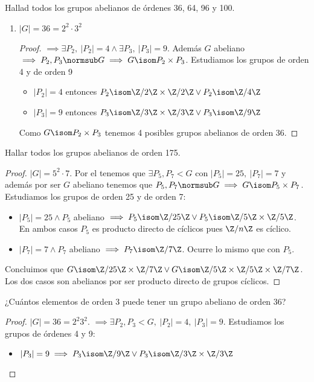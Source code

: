 \begin{ex}[H4.20] Hallad todos los grupos abelianos de órdenes 36, 64, 96 y 100.
	\begin{enumerate}
		\item $|G| = 36 = 2^2\cdot3^2$
		\begin{proof}
			 $\implies \exists P_2,\ |P_2| = 4 \land \exists P_3,\ |P_3| = 9$. Además $G$ abeliano $\implies P_2, P_3 \normsub G \implies G \isom P_2 \times P_3$. Estudiamos los grupos de orden 4 y de orden 9
			\begin{itemize}
				\item $|P_2| = 4$ entonces $P_2 \isom \Z/2\Z \times \Z/2\Z \lor P_2 \isom \Z/4\Z$
				\item $|P_3| = 9$ entonces $P_3 \isom \Z/3\Z \times \Z/3\Z \lor P_3 \isom \Z/9\Z$
			\end{itemize}
			Como $G \isom P_2 \times P_3$ tenemos 4 posibles grupos abelianos de orden 36.
		\end{proof}
	\end{enumerate}
\end{ex}

\begin{ex}[H4.22]
	Hallar todos los grupos abelianos de orden 175.
	
	\begin{proof}
		$|G| = 5^2\cdot 7$. Por el  tenemos que $\exists P_5, P_7 < G$ con $|P_5| = 25,\ |P_7| = 7$ y además por ser $G$ abeliano tenemos que $P_5, P_7 \normsub G \implies G \isom P_5 \times P_7$. Estudiamos los grupos de orden 25 y de orden 7:
		\begin{itemize}
			\item $|P_5| = 25 \land P_5$ abeliano $\implies P_5 \isom \Z/25\Z \lor P_5 \isom \Z/5\Z \times \Z/5\Z$. En ambos casos $P_5$ es producto directo de cíclicos pues $\Z/n\Z$ es cíclico.
			\item $|P_7| = 7 \land P_7$ abeliano $\implies P_7 \isom \Z/7\Z$. Ocurre lo mismo que con $P_5$.
		\end{itemize}
		Concluimos que $G \isom \Z/25\Z \times \Z/7\Z \lor G \isom \Z/5\Z \times \Z/5\Z \times \Z/7\Z$. Los dos casos son abelianos por ser producto directo de grupos cíclicos.
	\end{proof}
\end{ex}

\begin{ex}[H4.23]
	¿Cuántos elementos de orden 3 puede tener un grupo abeliano de orden 36?
	
	\begin{proof}
		$|G| = 36 = 2^2 3^2$.  $\implies \exists P_2, P_3 < G,\ |P_2| = 4,\ |P_3| = 9$. Estudiamos los grupos de órdenes 4 y 9:
		\begin{itemize}
			\item $|P_3| = 9 \implies P_3 \isom \Z/9\Z \lor P_3 \isom \Z/3\Z \times \Z/3\Z$
		\end{itemize}
	\end{proof}
\end{ex}


